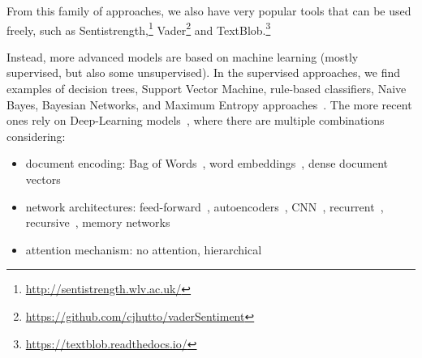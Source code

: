 From this family of approaches, we also have very popular tools that can be used freely, such as Sentistrength,\footnote{\url{http://sentistrength.wlv.ac.uk/}} Vader\footnote{\url{https://github.com/cjhutto/vaderSentiment}} and TextBlob.\footnote{\url{ https://textblob.readthedocs.io/}}


Instead, more advanced models are based on machine learning (mostly supervised, but also some unsupervised).
In the supervised approaches, we find examples of decision trees, Support Vector Machine, rule-based classifiers, Naive Bayes, Bayesian Networks, and Maximum Entropy approaches~\citep{zharmagambetov2015sentiment,bayhaqy2018sentiment,fitri2019sentiment,rathi2018sentiment,xie2019improved}.
The more recent ones rely on Deep-Learning models~\citep{zhang2018deep}, where there are multiple combinations considering:
\begin{itemize}
    \item document encoding: Bag of Words~\citep{moraes2013document,zhai2016semisupervised}, word embeddings~\citep{tang2015document,chen2016neural}, dense document vectors~\citep{le2014distributed}
    \item network architectures: feed-forward~\citep{duncan2015neural}, autoencoders~\citep{zhai2016semisupervised,wu2019semi}, CNN~\citep{jianqiang2018deep,sun2019aspect}, recurrent~\citep{chen2017recurrent,xu2016cached}, recursive~\citep{wang2016recursive,nguyen2015phrasernn}, memory networks~\citep{li2017end,lv2021aspect}
    \item attention mechanism: no attention, hierarchical~\citep{zhou2016attention} %
\end{itemize}




